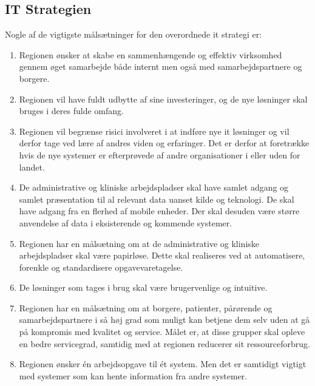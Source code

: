 \subsection{IT Strategien}
Nogle af de vigtigste målsætninger for den overordnede it strategi er:
\begin{enumerate}
	\item Regionen ønsker at skabe en sammenhængende og effektiv virksomhed gennem øget samarbejde både internt men også med samarbejdspartnere og borgere.
	\item Regionen vil have fuldt udbytte af sine investeringer, og de nye løsninger skal bruges i deres fulde omfang.
	\item Regionen vil begrænse risici involveret i at indføre nye it løsninger og vil derfor tage ved lære af andres viden og erfaringer. Det er derfor at foretrække hvis de nye systemer er efterprøvede af andre organisationer i eller uden for landet.
	\item De administrative og kliniske arbejdspladser skal have samlet adgang og samlet præsentation til al relevant data uanset kilde og teknologi. De skal have adgang fra en flerhed af mobile enheder. Der skal desuden være større anvendelse af data i eksisterende og kommende systemer.
	\item Regionen har en målsætning om at de administrative og kliniske arbejdspladser skal være papirløse. Dette skal realiseres ved at automatisere, forenkle og standardisere opgavevaretagelse.
	\item De løsninger som tages i brug skal være brugervenlige og intuitive.
	\item Regionen har en målsætning om at borgere, patienter,
	pårørende og samarbejdspartnere i så høj grad som muligt kan betjene dem selv uden at gå på kompromis med kvalitet og service. Målet er, at disse grupper skal opleve en bedre servicegrad, samtidig med at regionen reducerer sit ressourceforbrug.
	\item Regionen ønsker én arbejdsopgave til ét system. Men det er samtidigt vigtigt med systemer som kan hente information fra andre systemer.
\end{enumerate}
